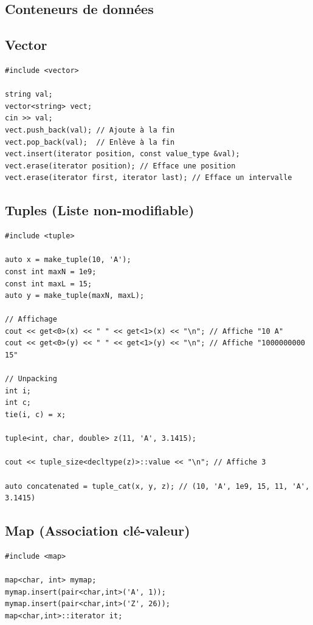 \documentclass{article}
\begin{document}
\begin{multicols*}{3}
\section*{Conteneurs de données}

\subsection*{Vector}

\begin{lstlisting}
#include <vector>

string val;
vector<string> vect;
cin >> val;
vect.push_back(val); // Ajoute à la fin
vect.pop_back(val);  // Enlève à la fin
vect.insert(iterator position, const value_type &val);
vect.erase(iterator position); // Efface une position
vect.erase(iterator first, iterator last); // Efface un intervalle

\end{lstlisting}

\subsection*{Tuples (Liste non-modifiable)}

\begin{lstlisting}
#include <tuple>

auto x = make_tuple(10, 'A');
const int maxN = 1e9;
const int maxL = 15;
auto y = make_tuple(maxN, maxL);

// Affichage
cout << get<0>(x) << " " << get<1>(x) << "\n"; // Affiche "10 A"
cout << get<0>(y) << " " << get<1>(y) << "\n"; // Affiche "1000000000 15"

// Unpacking
int i;
int c;
tie(i, c) = x;

tuple<int, char, double> z(11, 'A', 3.1415);

cout << tuple_size<decltype(z)>::value << "\n"; // Affiche 3

auto concatenated = tuple_cat(x, y, z); // (10, 'A', 1e9, 15, 11, 'A', 3.1415)

\end{lstlisting}

\subsection*{Map (Association clé-valeur)}

\begin{lstlisting}
#include <map>

map<char, int> mymap;
mymap.insert(pair<char,int>('A', 1));
mymap.insert(pair<char,int>('Z', 26));
map<char,int>::iterator it;


\end{lstlisting}
\end{multicols*}
\end{document}
